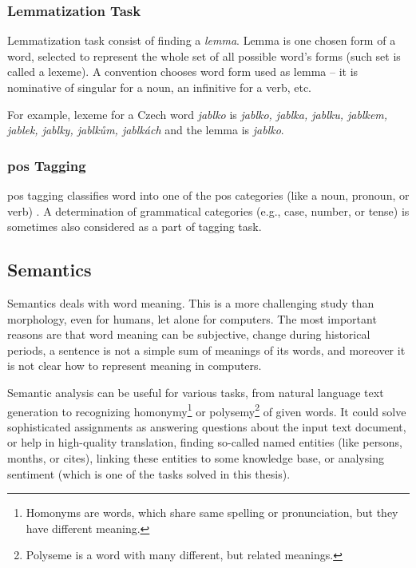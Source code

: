 \par
\subsubsection{Lemmatization Task}
Lemmatization task consist of finding a \textit{lemma}. Lemma is one chosen form of a word, selected to represent the whole set of all possible word's forms (such set is called a lexeme).  A convention chooses word form used as lemma -- it is nominative of singular for a noun, an infinitive for a verb, etc.
\par
For example, lexeme for a Czech word \textit{jablko} is \textit{jablko, jablka, jablku,  jablkem, jablek, jablky, jablkům, jablkách} and the lemma is \textit{jablko}.

\subsubsection{\acrshort{pos} Tagging} 
\acrshort{pos} tagging classifies word into one of the \acrshort{pos} categories (like a noun, pronoun, or verb) \citep{Hladka}. A determination of grammatical categories (e.g., case, number, or tense) is sometimes also considered as a part of tagging task.

\subsection{Semantics}
Semantics deals with word meaning. This is a more challenging study than morphology, even for humans, let alone for computers. The most important reasons are that word meaning can be subjective, change during historical periods, a sentence is not a simple sum of meanings of its words, and moreover it is not clear how to represent meaning in computers.
\par
Semantic analysis can be useful for various tasks, from natural language text generation to recognizing homonymy\footnote{Homonyms are words, which share same spelling or pronunciation, but they have different meaning.} or polysemy\footnote{Polyseme is a word with many different, but related meanings.} of given words. It could solve sophisticated assignments as answering questions about the input text document, or help in high-quality translation, finding so-called named entities (like persons, months, or cites), linking these entities to some knowledge base, or analysing sentiment (which is one of the tasks solved in this thesis).

